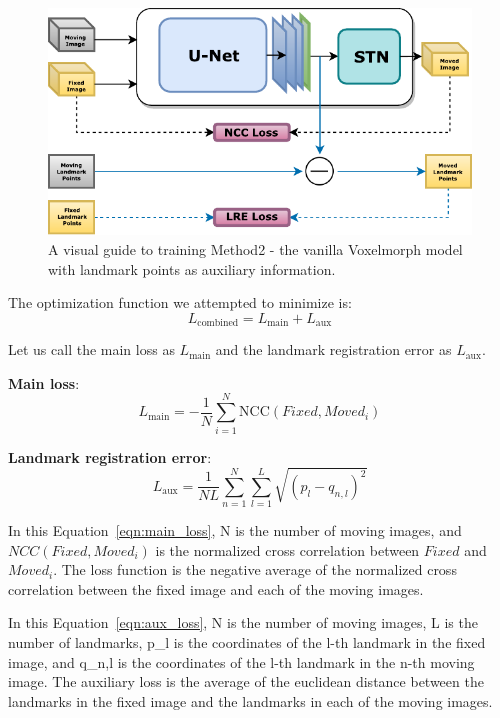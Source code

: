 \documentclass{report}
\begin{document}
	\begin{figure}[h!]
		\centering
		\includegraphics[width=0.6\columnwidth]{resources/chapter4/methods/Method2.pdf}
		\caption{A visual guide to training Method2 - the vanilla Voxelmorph model with landmark points as auxiliary information.}
		\label{fig:block_method2}
	\end{figure}
	
	The optimization function we attempted to minimize is:
	\begin{equation}
	L_\text{combined} = L_\text{main} + L_\text{aux} \label{eqn:combined_loss}
	\end{equation}	
	
	Let us call the main loss as $L_\text{main}$ and the landmark registration error as $L_\text{aux}$.
	
	\textbf{Main loss}:
	\begin{equation}
	L_\text{main} = -\frac{1}{N} \sum_{i=1}^N \text{NCC}(Fixed, Moved_i) \label{eqn:main_loss}
	\end{equation}
	
	\textbf{Landmark registration error}:
	\begin{equation}
		L_\text{aux} = \frac{1}{NL} \sum_{n=1}^N \sum_{l=1}^L \sqrt{(p_l - q_{n,l})^2}
		\label{eqn:aux_loss}
	\end{equation}
	
	In this Equation~\ref{eqn:main_loss}, N is the number of moving images, and $NCC(Fixed, Moved_i)$ is the normalized cross correlation between $Fixed$ and $Moved_i$. The loss function is the negative average of the normalized cross correlation between the fixed image and each of the moving images.
	
	In this Equation~\ref{eqn:aux_loss}, N is the number of moving images, L is the number of landmarks, p\_l is the coordinates of the l-th landmark in the fixed image, and q\_{n,l} is the coordinates of the l-th landmark in the n-th moving image. The auxiliary loss is the average of the euclidean distance between the landmarks in the fixed image and the landmarks in each of the moving images.
	
\end{document}
